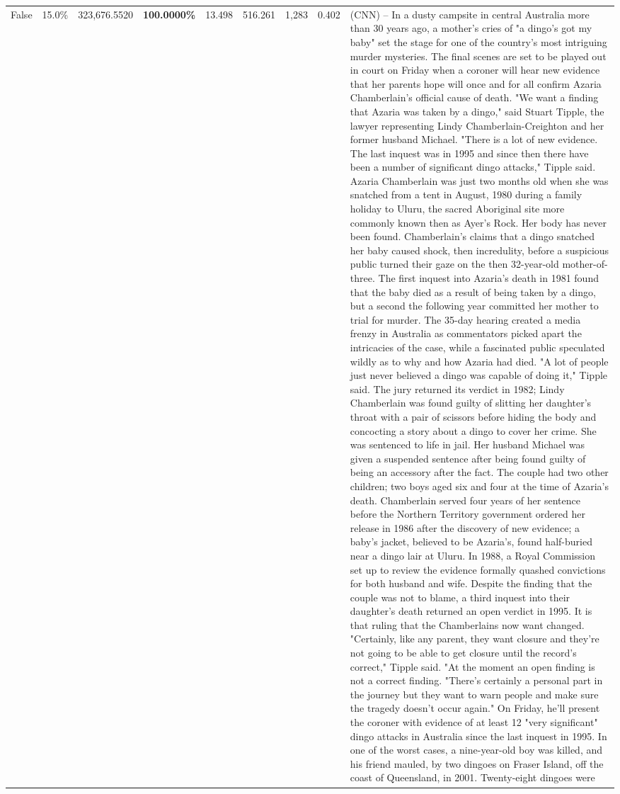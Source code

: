 \begin{table}[H]
\begin{tabular}{lllrlllll}
False & 15.0\% & 323,676.5520 & \bfseries \color{red} 100.0000\% & 13.498 & 516.261 & 1,283 & 0.402 & (CNN) -- In a dusty campsite in central Australia more than 30 years ago, a mother's cries of "a dingo's got my baby" set the stage for one of the country's most intriguing murder mysteries. The final scenes are set to be played out in court on Friday when a coroner will hear new evidence that her parents hope will once and for all confirm Azaria Chamberlain's official cause of death. "We want a finding that Azaria was taken by a dingo," said Stuart Tipple, the lawyer representing Lindy Chamberlain-Creighton and her former husband Michael. "There is a lot of new evidence. The last inquest was in 1995 and since then there have been a number of significant dingo attacks," Tipple said. Azaria Chamberlain was just two months old when she was snatched from a tent in August, 1980 during a family holiday to Uluru, the sacred Aboriginal site more commonly known then as Ayer's Rock. Her body has never been found. Chamberlain's claims that a dingo snatched her baby caused shock, then incredulity, before a suspicious public turned their gaze on the then 32-year-old mother-of-three. The first inquest into Azaria's death in 1981 found that the baby died as a result of being taken by a dingo, but a second the following year committed her mother to trial for murder. The 35-day hearing created a media frenzy in Australia as commentators picked apart the intricacies of the case, while a fascinated public speculated wildly as to why and how Azaria had died. "A lot of people just never believed a dingo was capable of doing it," Tipple said. The jury returned its verdict in 1982; Lindy Chamberlain was found guilty of slitting her daughter's throat with a pair of scissors before hiding the body and concocting a story about a dingo to cover her crime. She was sentenced to life in jail. Her husband Michael was given a suspended sentence after being found guilty of being an accessory after the fact. The couple had two other children; two boys aged six and four at the time of Azaria's death. Chamberlain served four years of her sentence before the Northern Territory government ordered her release in 1986 after the discovery of new evidence; a baby's jacket, believed to be Azaria's, found half-buried near a dingo lair at Uluru. In 1988, a Royal Commission set up to review the evidence formally quashed convictions for both husband and wife. Despite the finding that the couple was not to blame, a third inquest into their daughter's death returned an open verdict in 1995. It is that ruling that the Chamberlains now want changed. "Certainly, like any parent, they want closure and they're not going to be able to get closure until the record's correct," Tipple said. "At the moment an open finding is not a correct finding. "There's certainly a personal part in the journey but they want to warn people and make sure the tragedy doesn't occur again." On Friday, he'll present the coroner with evidence of at least 12 "very significant" dingo attacks in Australia since the last inquest in 1995. In one of the worst cases, a nine-year-old boy was killed, and his friend mauled, by two dingoes on Fraser Island, off the coast of Queensland, in 2001. Twenty-eight dingoes were 
\end{tabular}
\end{table}
